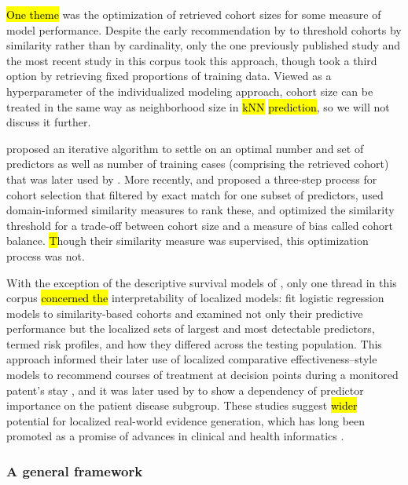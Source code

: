 \documentclass[sn-mathphys,Numbered,pdflatex]{sn-jnl}
\theoremstyle{remark}
\theoremstyle{definition}
\begin{document}
\hl{One theme} was the optimization of retrieved cohort sizes for some
measure of model performance. Despite the early recommendation by
\citet{Park2006} to threshold cohorts by similarity rather than by
cardinality, only the one previously published study
\citep{Mariuzzi1997} and the most recent study \citep{Tang2021, Ng2021}
in this corpus took this approach, though \citet{Liu2022} took a third
option by retrieving fixed proportions of training data. Viewed as a
hyperparameter of the individualized modeling approach, cohort size can
be treated in the same way as neighborhood size in \hl{kNN} \hl{prediction},
so we will not discuss it further.

\citet{Kasabov2010} proposed an iterative algorithm to settle on an
optimal number and set of predictors as well as number of training cases
(comprising the retrieved cohort) that was later used by
\citet{Liang2015}. More recently, \citet{Tang2021} and \citet{Ng2021}
proposed a three-step process for cohort selection that filtered by
exact match for one subset of predictors, used domain-informed
similarity measures to rank these, and optimized the similarity
threshold for a trade-off between cohort size and a measure of bias
called cohort balance. \hl{T}hough their similarity measure was
supervised, this optimization process was not.

With the exception of the descriptive survival models of
\citet{Mariuzzi1997}, only one thread in this corpus \hl{concerned the}
interpretability of localized models: \citet{Ng2015} fit logistic
regression models to similarity-based cohorts and examined not only
their predictive performance but the localized sets of largest and most
detectable predictors, termed risk profiles, and how they differed
across the testing population. This approach informed their later use of
localized comparative effectiveness--style models to recommend courses
of treatment at decision points during a monitored patent's stay
\citep{Tang2021, Ng2021}, and it was later used by \citet{Liu2022} to
show a dependency of predictor importance on the patient disease
subgroup. These studies suggest \hl{wider} potential for localized
real-world evidence generation, which has long been promoted as a
promise of advances in clinical and health informatics
\citep{Longhurst2014}.

\subsubsection{A general framework}\label{a-general-framework}
\end{document}
